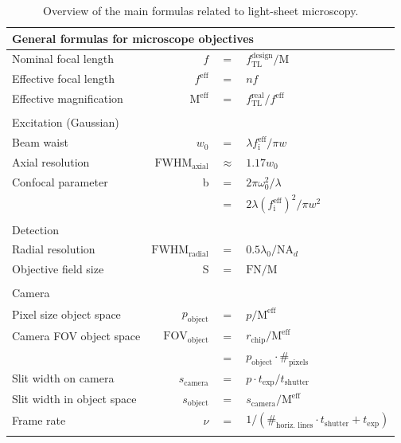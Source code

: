 \documentclass[12pt]{spieman}  %
\begin{document}
\begin{table}[t!]
	\centering
		\caption[Main formulas]{Overview of the main formulas related to light-sheet microscopy. \label{tab:resolution}}
		\begin{tabular}{lrcl}
		\\
		\multicolumn{4}{l}{General formulas for microscope objectives}\\\hline\hline 
		Nominal focal length							& $f$ 													& $=$					& $f_{\text{TL}}^{\text{design}}/\text{M}$				\\	
		Effective focal length						& $f^{\text{eff}}$							& $=$					& $nf$													\\
		Effective magnification						& $\text{M}^{\text{eff}}$				& $=$					& $f_{\text{TL}}^{\text{real}}/f^{\text{eff}}$			\\\\
		\multicolumn{4}{l}{Excitation (Gaussian)}\\\hline\hline	
		Beam waist												&$w_0$													& $=$ 				& $ \lambda f_{\text{i}}^{\text{eff}} / \pi w$				\\
		Axial resolution									&$\text{FWHM}_{\text{axial}}$		& $\approx$   & $ 1.17 w_0 $											\\
		Confocal parameter								& b															& $=$  				& $2 \pi \omega_0^2 / \lambda$							\\
																			&  															& $=$   			& $2 \lambda {(f_{\text{i}}^{\text{eff}})}^2 / \pi w^2 $	\\\\
		\multicolumn{4}{l}{Detection}\\\hline\hline  
		Radial resolution									&$\text{FWHM}_{\text{radial}}$	& $=$					& $0.5 \lambda_0 / \text{NA}_{d}$						\\
		Objective field size							& S															& $=$					& $\text{FN}/{\text{M}}$								\\\\
		\multicolumn{4}{l}{Camera}\\\hline\hline  
		Pixel size object space						& $ p_{\text{object}}$					& $=$					& $p/  \text{M}^{\text{eff}}$							\\
		Camera FOV object space						&$\text{FOV}_{\text{object}}$		& $=$					& $r_{\text{chip}} / \text{M}^{\text{eff}}$				\\
																			&																& $=$					& $p_{\text{object}} \cdot \#_{\text{pixels}}$			\\
		Slit width on camera							& $s_{\text{camera}}$						& $=$					& $ p \cdot t_{\text{exp}} / t_{\text{shutter}} $			\\
		Slit width in object space				& $s_{\text{object}}$						& $=$					& $ s_{\text{camera}}/ \text{M}^{\text{eff}}$			\\
		Frame rate												& $\nu$													& $=$					& $1/(\#_{\text{horiz. lines}} \cdot t_{\text{shutter}} + t_{\text{exp}})$ \\\\

		\end{tabular}
\end{table}

\end{document}
